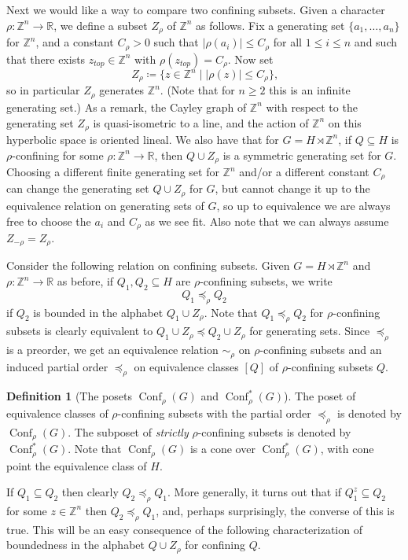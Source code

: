 \documentclass[reqno,12pt]{amsart}\setcounter{tocdepth}{1}
\theoremstyle{definition}
\newtheorem{definition}[theorem]{Definition}
\newcommand{\Z}{\mathbb{Z}}
\newcommand{\R}{\mathbb{R}}
\DeclareMathOperator{\Conf}{Conf}
\numberwithin{equation}{section}
\begin{document}
\medskip

Next we would like a way to compare two confining subsets. Given a character $\rho\colon \Z^n\to\R$, we define a subset $Z_\rho$ of $\Z^n$ as follows. Fix a generating set $\{a_1,\dots,a_n\}$ for $\Z^n$, and a constant $C_\rho>0$ such that $|\rho(a_i)| \leq C_\rho$ for all $1\le i\le n$ and such that there exists $z_{top}\in \Z^n$ with $\rho(z_{top})=C_\rho$. Now set
\[
Z_\rho \coloneqq \{z\in\Z^n \mid |\rho(z)|\le C_\rho\}\text{,}
\]
so in particular $Z_\rho$ generates $\Z^n$. (Note that for $n\ge 2$ this is an infinite generating set.) As a remark, the Cayley graph of $\Z^n$ with respect to the generating set $Z_\rho$ is quasi-isometric to a line, and the action of $\Z^n$ on this hyperbolic space is oriented lineal. We also have that for $G=H\rtimes \Z^n$, if $Q\subseteq H$ is $\rho$-confining for some $\rho\colon \Z^n\to\R$, then $Q\cup Z_\rho$ is a symmetric generating set for $G$. Choosing a different finite generating set for $\Z^n$ and/or a different constant $C_\rho$ can change the generating set $Q\cup Z_\rho$ for $G$, but cannot change it up to the equivalence relation on generating sets of $G$, so up to equivalence we are always free to choose the $a_i$ and $C_\rho$ as we see fit. Also note that we can always assume $Z_{-\rho}=Z_\rho$.

Consider the following relation on confining subsets. Given $G=H\rtimes \Z^n$ and $\rho\colon\Z^n\to\R$ as before, if $Q_1,Q_2\subseteq H$ are $\rho$-confining subsets, we write
\[
Q_1\preceq_\rho Q_2
\]
if $Q_2$ is bounded in the alphabet $Q_1\cup Z_\rho$. Note that $Q_1\preceq_\rho Q_2$ for $\rho$-confining subsets is clearly equivalent to $Q_1\cup Z_\rho\preceq Q_2\cup Z_\rho$ for generating sets. Since $\preceq_\rho$ is a preorder, we get an equivalence relation $\sim_\rho$ on $\rho$-confining subsets and an induced partial order $\preccurlyeq_\rho$ on equivalence classes $[Q]$ of $\rho$-confining subsets $Q$.

\begin{definition}[The posets $\Conf_\rho(G)$ and $\Conf^\ast_\rho(G)$]\label{def:conf_poset}
The poset of equivalence classes of $\rho$-confining subsets with the partial order $\preccurlyeq_\rho$ is denoted by $\Conf_\rho(G)$. The subposet of \emph{strictly} $\rho$-confining subsets is denoted by $\Conf^\ast_\rho(G)$. Note that $\Conf_\rho(G)$ is a cone over $\Conf^\ast_\rho(G)$, with cone point the equivalence class of $H$.
\end{definition}

If $Q_1 \subseteq Q_2$ then clearly $Q_2 \preceq_\rho Q_1$. More generally, it turns out that if $Q_1^z \subseteq Q_2$ for some $z\in \Z^n$ then $Q_2 \preceq_\rho Q_1$, and, perhaps surprisingly, the converse of this is true. This will be an easy consequence of the following characterization of boundedness in the alphabet $Q\cup Z_\rho$ for confining $Q$.
\end{document}
